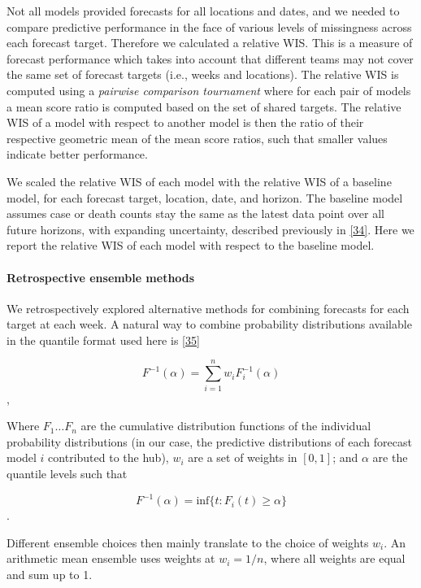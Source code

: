 \documentclass[
]{article}
\begin{document}
Not all models provided forecasts for all locations and dates, and we needed to compare predictive performance in the face of various levels of missingness across each forecast target. Therefore we calculated a relative WIS. This is a measure of forecast performance which takes into account that different teams may not cover the same set of forecast targets (i.e., weeks and locations). The relative WIS is computed using a \emph{pairwise comparison tournament} where for each pair of models a mean score ratio is computed based on the set of shared targets. The relative WIS of a model with respect to another model is then the ratio of their respective geometric mean of the mean score ratios, such that smaller values indicate better performance.

We scaled the relative WIS of each model with the relative WIS of a baseline model, for each forecast target, location, date, and horizon. The baseline model assumes case or death counts stay the same as the latest data point over all future horizons, with expanding uncertainty, described previously in \protect\hyperlink{ref-cramerEvaluationIndividualEnsemble2021}{{[}34{]}}. Here we report the relative WIS of each model with respect to the baseline model.

\hypertarget{retrospective-ensemble-methods}{%
\paragraph{Retrospective ensemble methods}\label{retrospective-ensemble-methods}}

We retrospectively explored alternative methods for combining forecasts for each target at each week. A natural way to combine probability distributions available in the quantile format used here is \protect\hyperlink{ref-genestVincentizationRevisited1992}{{[}35{]}}

\[F^{-1}(\alpha) = \sum_{i=1}^{n}w_i F_i^{-1}(\alpha)\] ,

Where \(F_{1} \ldots F_{n}\) are the cumulative distribution functions of the individual probability distributions (in our case, the predictive distributions of each forecast model \(i\) contributed to the hub), \(w_i\) are a set of weights in \([0,1]\); and \(\alpha\) are the quantile levels such that

\[F^{-1}(\alpha) = \mathrm{inf} \{t : F_i(t) \geq \alpha \}\] .

Different ensemble choices then mainly translate to the choice of weights \(w_i\). An arithmetic mean ensemble uses weights at \(w_i=1/n\), where all weights are equal and sum up to 1.
\end{document}
